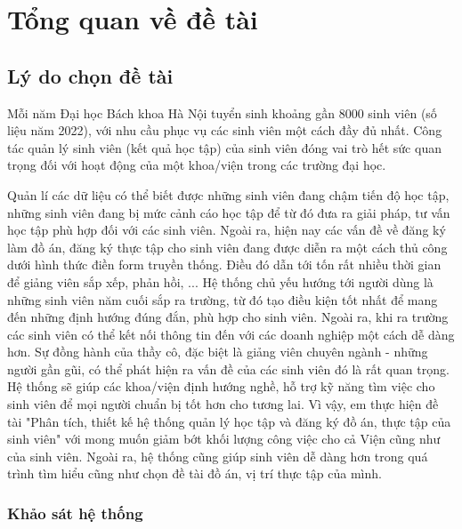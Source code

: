 \chapter{Tổng quan về đề tài}
\section{Lý do chọn đề tài}
Mỗi năm Đại học Bách khoa Hà Nội tuyển sinh khoảng gần 8000 sinh viên (số liệu năm 2022), với nhu cầu phục vụ các sinh viên một cách đầy đủ nhất.
Công tác quản lý sinh viên (kết quả học tập) của sinh viên đóng vai trò hết sức quan trọng đối với hoạt động của một khoa/viện trong các trường đại học.

Quản lí các dữ liệu có thể biết được những sinh viên đang chậm tiến độ học tập, những sinh viên đang bị mức cảnh cáo học tập để từ đó đưa ra giải pháp, tư vấn học tập phù hợp đối với các sinh viên.
Ngoài ra, hiện nay các vấn đề về đăng ký làm đồ án, đăng ký thực tập cho sinh viên đang được diễn ra một cách thủ công dưới hình thức điền form truyền thống.
Điều đó dẫn tới tốn rất nhiều thời gian để giảng viên sắp xếp, phản hồi, ... 
Hệ thống chủ yếu hướng tới người dùng là những sinh viên năm cuối sắp ra trường, từ đó tạo điều kiện tốt nhất để mang đến những định hướng đúng đắn, phù hợp cho sinh viên.
Ngoài ra, khi ra trường các sinh viên có thể kết nối thông tin đến với các doanh nghiệp một cách dễ dàng hơn.
Sự đồng hành của thầy cô, đặc biệt là giảng viên chuyên ngành - những người gần gũi, có thể phát hiện ra vấn đề của các sinh viên đó là rất quan trọng.
Hệ thống sẽ giúp các khoa/viện định hướng nghề, hỗ trợ kỹ năng tìm việc cho sinh viên để mọi người chuẩn bị tốt hơn cho tương lai.
Vì vậy, em thực hiện đề tài "Phân tích, thiết kế hệ thống quản lý học tập và đăng ký đồ án, thực tập của sinh viên"
với mong muốn giảm bớt khối lượng công việc cho cả Viện cũng như của sinh viên. Ngoài ra, hệ thống cũng giúp sinh viên dễ dàng hơn trong quá trình
tìm hiểu cũng như chọn đề tài đồ án, vị trí thực tập của mình.\\

\subsection*{Khảo sát hệ thống}

